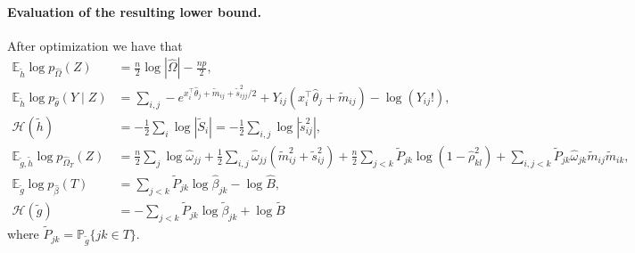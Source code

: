 \documentclass[a4paper, 10pt]{article}
\newcommand{\Esp}{\mathbb{E}}
\newcommand{\Hcal}{\mathcal{H}}
\renewcommand{\Pr}{\mathbb{P}}
\begin{document}
\paragraph{Evaluation of the resulting lower bound.} After optimization we have that
\begin{align*}
 \Esp_{\widetilde{h}} \log p_{\widehat{\Omega}}(Z)
 & = \frac{n}2 \log |\widehat{\Omega}| - \frac{np}2, \\
 \Esp_{\widetilde{h}} \log p_{\widehat{\theta}}(Y \mid Z)
 & = \sum_{i, j} - e^{x_i^\intercal \widehat{\theta}_j + \widetilde{m}_{ij} + \widetilde{s}_{ijj}^2/2} + Y_{ij} (x_i^\intercal \widehat{\theta}_j + \widetilde{m}_{ij}) - \log(Y_{ij} !), \\
 \Hcal(\widetilde{h})
 & = - \frac12 \sum_i \log|\widetilde{S}_i|
 = - \frac12 \sum_{i, j} \log|\widetilde{s}_{ij}^2|, \\
 \Esp_{\widetilde{g}, \widetilde{h}} \log p_{\widehat{\Omega}_T}(Z)
 & = 
 \frac{n}2 \sum_j \log \widehat{\omega}_{jj} 
 + \frac12 \sum_{i, j} \widehat{\omega}_{jj} (\widetilde{m}_{ij}^2 + \widetilde{s}_{ij}^2) 
 + \frac{n}2 \sum_{j < k} \widetilde{P}_{jk} \log(1 - \widehat{\rho}_{kl}^2)
 + \sum_{i, j < k} \widetilde{P}_{jk} \widehat{\omega}_{jk} \widetilde{m}_{ij} \widetilde{m}_{ik}, \\
 \Esp_{\widetilde{g}} \log p_{\widehat{\beta}}(T) 
 & = \sum_{j < k} \widetilde{P}_{jk} \log \widehat{\beta}_{jk} - \log \widehat{B}, 
\\
 \Hcal(\widetilde{g})
 & = - \sum_{j < k} \widetilde{P}_{jk} \log \widetilde{\beta}_{jk} + \log \widetilde{B}
\end{align*}
 where $\widetilde{P}_{jk} = \Pr_{\widetilde{g}}\{jk \in T\}$. 




\newpage 



\end{document}
